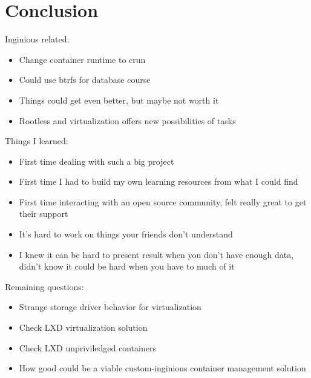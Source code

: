 \chapter{Conclusion}


Inginious related:
\begin{itemize}
  \item Change container runtime to crun
  \item Could use btrfs for database course
  \item Things could get even better, but maybe not worth it
  \item Rootless and virtualization offers new possibilities of tasks
\end{itemize}


Things I learned:
\begin{itemize}
  \item First time dealing with such a big project
  \item First time I had to build my own learning resources from what I could find
  \item First time interacting with an open source community, felt really great to get their support
  \item It's hard to work on things your friends don't understand
  \item I knew it can be hard to present result when you don't have enough data, didn't know it could be hard when you have to much of it
\end{itemize}


Remaining questions:
\begin{itemize}
  \item Strange storage driver behavior for virtualization
  \item Check LXD virtualization solution
  \item Check LXD unpriviledged containers
  \item How good could be a viable custom-inginious container management solution
\end{itemize}
